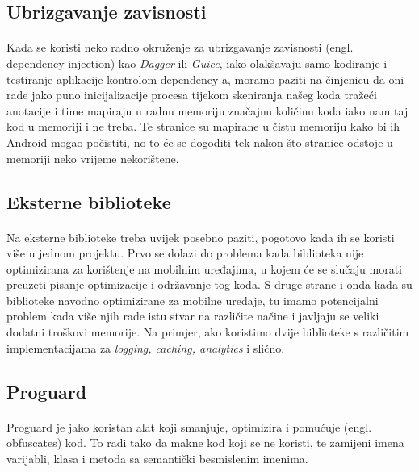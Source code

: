 \documentclass[times, utf8, zavrsni]{fer}
\begin{document}
\subsection{Ubrizgavanje zavisnosti}
\paragraph{}
Kada se koristi neko radno okruženje za ubrizgavanje zavisnosti (engl. dependency injection) kao \textit{Dagger} ili \textit{Guice}, iako olakšavaju samo kodiranje i testiranje aplikacije kontrolom dependency-a, moramo paziti na činjenicu da oni rade jako puno inicijalizacije procesa tijekom skeniranja našeg koda tražeći anotacije i time mapiraju u radnu memoriju značajnu količinu koda iako nam taj kod u memoriji i ne treba. Te stranice su mapirane u čistu memoriju kako bi ih Android mogao počistiti, no to će se dogoditi tek nakon što stranice odstoje u memoriji neko vrijeme nekorištene.

\subsection{Eksterne biblioteke}
\paragraph{}
Na eksterne biblioteke treba uvijek posebno paziti, pogotovo kada ih se koristi više u jednom projektu. Prvo se dolazi do problema kada biblioteka nije optimizirana za korištenje na mobilnim uređajima, u kojem će se slučaju morati preuzeti pisanje optimizacije i održavanje tog koda. S druge strane i onda kada su biblioteke navodno optimizirane za mobilne uređaje, tu imamo potencijalni problem kada više njih rade istu stvar na različite načine i javljaju se veliki dodatni troškovi memorije. Na primjer, ako koristimo dvije biblioteke s različitim implementacijama za \textit{logging, caching, analytics} i slično.

\subsection{Proguard}
\paragraph{}
Proguard je jako koristan alat koji smanjuje, optimizira i pomućuje (engl. obfuscates) kod. To radi tako da makne kod koji se ne koristi, te zamijeni imena varijabli, klasa i metoda sa semantički besmislenim imenima. 
\end{document}
